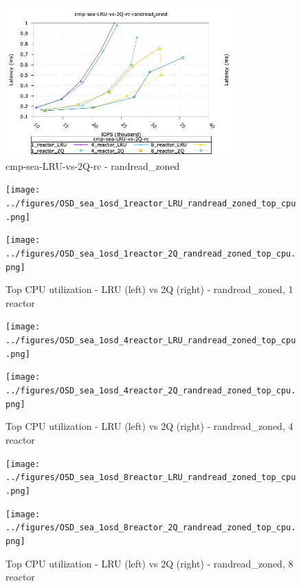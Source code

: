 \begin{figure}[!ht]
\centering
\includegraphics[width=0.8\textwidth]{../figures/cmp_sea_LRU_vs_2Q_rc_randread_zoned_iops_vs_lat.png}
\caption{cmp-sea-LRU-vs-2Q-rc - randread\_zoned}
\label{fig:cmp_sea_LRU_vs_2Q_rc_randread_zoned}
\end{figure}


\begin{figure}[!ht]
  \centering
  \begin{minipage}{.5\textwidth}
  \centering
    \texttt{[image: ../figures/OSD\_sea\_1osd\_1reactor\_LRU\_randread\_zoned\_top\_cpu.png]}
  \end{minipage}%
  \begin{minipage}{.5\textwidth}
  \centering
    \texttt{[image: ../figures/OSD\_sea\_1osd\_1reactor\_2Q\_randread\_zoned\_top\_cpu.png]}
  \end{minipage}%
  \caption{Top CPU utilization - LRU (left) vs 2Q (right) - randread\_zoned, 1 reactor}
  \label{figure:1-reactor-cpu-randread_zoned}
\end{figure}

\begin{figure}[!ht]
  \centering
  \begin{minipage}{.5\textwidth}
  \centering
    \texttt{[image: ../figures/OSD\_sea\_1osd\_4reactor\_LRU\_randread\_zoned\_top\_cpu.png]}
  \end{minipage}%
  \begin{minipage}{.5\textwidth}
  \centering
    \texttt{[image: ../figures/OSD\_sea\_1osd\_4reactor\_2Q\_randread\_zoned\_top\_cpu.png]}
  \end{minipage}%
  \caption{Top CPU utilization - LRU (left) vs 2Q (right) - randread\_zoned, 4 reactor}
  \label{figure:4-reactor-cpu-randread_zoned}
\end{figure}

\begin{figure}[!ht]
  \centering
  \begin{minipage}{.5\textwidth}
  \centering
    \texttt{[image: ../figures/OSD\_sea\_1osd\_8reactor\_LRU\_randread\_zoned\_top\_cpu.png]}
  \end{minipage}%
  \begin{minipage}{.5\textwidth}
  \centering
    \texttt{[image: ../figures/OSD\_sea\_1osd\_8reactor\_2Q\_randread\_zoned\_top\_cpu.png]}
  \end{minipage}%
  \caption{Top CPU utilization - LRU (left) vs 2Q (right) - randread\_zoned, 8 reactor}
  \label{figure:8-reactor-cpu-randread_zoned}
\end{figure}

